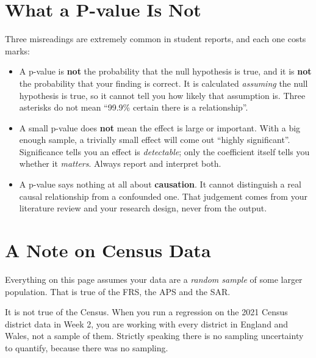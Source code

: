 \documentclass[
  letterpaper,
  DIV=11,
  numbers=noendperiod]{scrreprt}
\providecommand{\tightlist}{%
  \setlength{\itemsep}{0pt}\setlength{\parskip}{0pt}}
\begin{document}
\section*{What a P-value Is Not}\label{what-a-p-value-is-not}


Three misreadings are extremely common in student reports, and each one
costs marks:

\begin{itemize}
\tightlist
\item
  A p-value is \textbf{not} the probability that the null hypothesis is
  true, and it is \textbf{not} the probability that your finding is
  correct. It is calculated \emph{assuming} the null hypothesis is true,
  so it cannot tell you how likely that assumption is. Three asterisks
  do not mean ``99.9\% certain there is a relationship''.
\item
  A small p-value does \textbf{not} mean the effect is large or
  important. With a big enough sample, a trivially small effect will
  come out ``highly significant''. Significance tells you an effect is
  \emph{detectable}; only the coefficient itself tells you whether it
  \emph{matters}. Always report and interpret both.
\item
  A p-value says nothing at all about \textbf{causation}. It cannot
  distinguish a real causal relationship from a confounded one. That
  judgement comes from your literature review and your research design,
  never from the output.
\end{itemize}

\section*{A Note on Census Data}\label{a-note-on-census-data}


Everything on this page assumes your data are a \emph{random sample} of
some larger population. That is true of the FRS, the APS and the SAR.

It is not true of the Census. When you run a regression on the 2021
Census district data in Week 2, you are working with every district in
England and Wales, not a sample of them. Strictly speaking there is no
sampling uncertainty to quantify, because there was no sampling.
\end{document}
